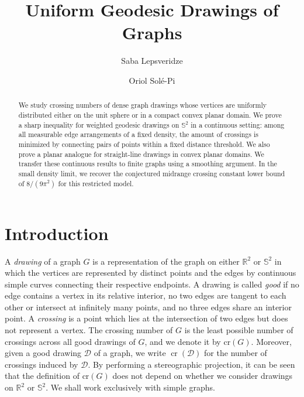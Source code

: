 \documentclass[reqno, 11pt]{amsart}
\author{Saba Lepsveridze}
\author{Oriol Solé-Pi}
\theoremstyle{definition}
\begin{document}
\title{Uniform Geodesic Drawings of Graphs}
\begin{abstract}
We study crossing numbers of dense graph drawings whose vertices are uniformly distributed either on the unit sphere or in a compact convex planar domain.  We prove a sharp inequality for weighted geodesic drawings on $\mathbb S^2$ in a continuous setting: among all measurable edge arrangements of a fixed density, the amount of crossings is minimized by connecting pairs of points within a fixed distance threshold.  We also prove a planar analogue for straight-line drawings in convex planar domains. We transfer these continuous results to finite graphs using a smoothing argument. In the small density limit, we recover the conjectured midrange crossing constant lower bound of $8/(9\pi^2)$ for this restricted model.
\end{abstract}

\maketitle


\section{Introduction}\label{sec:intro}
A \textit{drawing} of a graph $G$ is a representation of the graph on either $\mathbb R^2$ or $\mathbb S^2$ in which the vertices are represented by distinct points and the edges by continuous simple curves connecting their respective endpoints. A drawing is called \textit{good} if no edge contains a vertex in its relative interior, no two edges are tangent to each other or intersect at infinitely many points, and no three edges share an interior point. A \textit{crossing} is a point which lies at the intersection of two edges but does not represent a vertex. The crossing number of $G$ is the least possible number of crossings across all good drawings of $G$, and we denote it by $\mathrm{cr}(G)$. Moreover, given a good drawing $\mathcal D$ of a graph, we write \(\operatorname{cr}({\mathcal D})\) for the number of crossings induced by $\mathcal D$. By performing a stereographic projection, it can be seen that the definition of $\mathrm{cr}(G)$ does not depend on whether we consider drawings on $\mathbb R^2$ or $\mathbb S^2$.  We shall work exclusively with simple graphs. 
\end{document}
